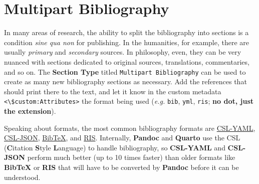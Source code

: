 \documentclass[
  12pt,
  a4paper,
  oneside,
  numbers=noenddot,
  titlepage,
  toclink=all,
  toc=bibliography]{scrbook}
\theoremstyle{definition}
\theoremstyle{definition}
\theoremstyle{definition}
\theoremstyle{plain}
\theoremstyle{plain}
\theoremstyle{plain}
\theoremstyle{plain}
\theoremstyle{plain}
\theoremstyle{remark}
\begin{document}
\hypertarget{sec-scriv42}{%
\section{Multipart Bibliography}\label{sec-scriv42}}

In many areas of research, the ability to split the bibliography into
sections is a condition \emph{sine qua non} for publishing. In the
humanities, for example, there are usually \emph{primary} and
\emph{secondary} sources. In philosophy, even, they can be very nuanced
with sections dedicated to original sources, translations, commentaries,
and so on. The \textbf{Section Type} titled
\texttt{Multipart\ Bibliography} can be used to create as many new
bibliography sections as necessary. Add the references that should print
there to the text, and let it know in the custom metadata
\texttt{\textless{}\textbackslash{}\$custom:Attributes\textgreater{}}
the format being used (\emph{e.g.} \texttt{bib}, \texttt{yml},
\texttt{ris}; \textbf{no dot, just the extension}).

\begin{tcolorbox}[enhanced jigsaw, rightrule=.15mm, bottomtitle=1mm, colback=white, toptitle=1mm, left=2mm, colbacktitle=quarto-callout-tip-color!10!white, opacitybacktitle=0.6, opacityback=0, arc=.35mm, leftrule=.75mm, toprule=.15mm, titlerule=0mm, breakable, coltitle=black, bottomrule=.15mm, colframe=quarto-callout-tip-color-frame, title=\textcolor{quarto-callout-tip-color}{\faLightbulb}\hspace{0.5em}{Bibliography formats}]

Speaking about formats, the most common bibliography formats are
\href{https://docs.citationstyles.org/en/stable/specification.html}{CSL-YAML},
\href{https://docs.citationstyles.org/en/stable/specification.html}{CSL-JSON},
\href{https://en.wikipedia.org/wiki/BibTeX\#Entry_types}{BibTeX}, and
\href{https://en.wikipedia.org/wiki/RIS_(file_format)\#Type_of_reference}{RIS}.
Internally, \textbf{Pandoc} and \textbf{Quarto} use the CSL
(\textbf{C}itation \textbf{S}tyle \textbf{L}anguage) to handle
bibliography, so \textbf{CSL-YAML} and \textbf{CSL-JSON} perform much
better (up to 10 times faster) than older formats like \textbf{BibTeX}
or \textbf{RIS} that will have to be converted by \textbf{Pandoc} before
it can be understood.

\end{tcolorbox}
\end{document}
